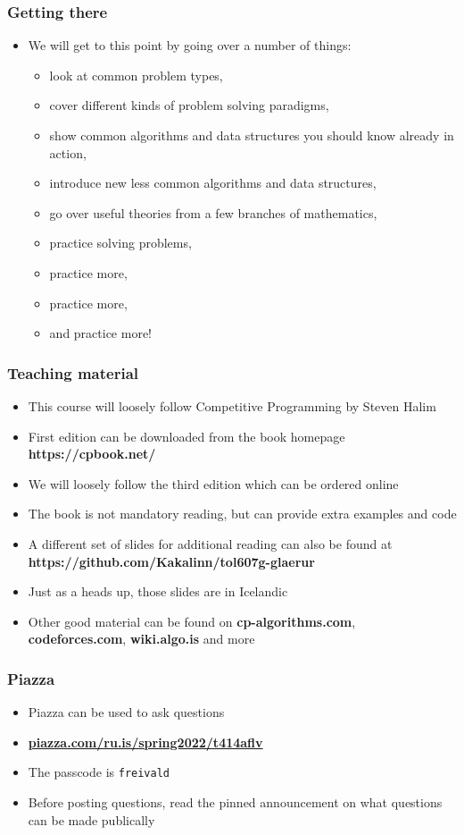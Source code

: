 \documentclass{beamer}
\begin{document}
\begin{frame}[plain]
	\frametitle{Getting there}
	\begin{itemize}
		 \item We will get to this point by going over a number of things:
		 \begin{itemize}
		 	\item look at common problem types,
		 	\item cover different kinds of problem solving paradigms,
		 	\item show common algorithms and data structures you should know already in action,
		 	\item introduce new less common algorithms and data structures,
		 	\item go over useful theories from a few branches of mathematics,
		 	\item practice solving problems,
		 	\item practice more,
		 	\item practice more,
		 	\item and practice more!
		 \end{itemize}
	\end{itemize}
\end{frame}

\begin{frame}[plain]
	\frametitle{Teaching material}
	\begin{itemize}
		 \item This course will loosely follow \alert{Competitive Programming} by Steven Halim
		 \item First edition can be downloaded from the book homepage \textbf{https://cpbook.net/}
		 \item We will loosely follow the third edition which can be ordered online
		 \item The book is not mandatory reading, but can provide extra examples and code
		 \item A different set of slides for additional reading can also be found at \textbf{https://github.com/Kakalinn/tol607g-glaerur}
		 \item Just as a heads up, those slides are in Icelandic
         \item Other good material can be found on \textbf{cp-algorithms.com}, \textbf{codeforces.com}, \textbf{wiki.algo.is} and more
     \end{itemize}
\end{frame}

\begin{frame}[plain]
	\frametitle{Piazza}
	\begin{itemize}
		\item Piazza can be used to ask questions
        \item \textbf{\url{piazza.com/ru.is/spring2022/t414aflv}}
        \item The passcode is \texttt{freivald}
        \item Before posting questions, read the pinned announcement on what questions can be made publically
	\end{itemize}
\end{frame}
\end{document}
